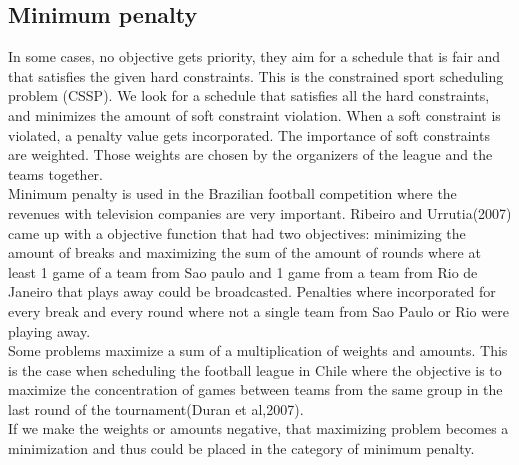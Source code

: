 \subsection{Minimum penalty}
In some cases, no objective gets priority, they aim for a schedule that is fair and that satisfies the given hard constraints. This is the constrained sport scheduling problem (CSSP). We look for a schedule that satisfies all the hard constraints, and minimizes the amount of soft constraint violation. When a soft constraint is violated, a penalty value gets incorporated. The importance of soft constraints are weighted. Those weights are chosen by the organizers of the league and the teams together.
\\[5px] 
Minimum penalty is used in the Brazilian football competition where the revenues with television companies are very important. Ribeiro and Urrutia(2007) came up with a objective function that had two objectives: minimizing the amount of breaks and maximizing the sum of the amount of rounds where at least 1 game of a team from Sao paulo and 1 game from a team from Rio de Janeiro that plays away could be broadcasted. Penalties where incorporated for every break and every round where not a single team from Sao Paulo or Rio were playing away. 
\\[5px]
Some problems maximize a sum of a multiplication of weights and amounts. This is the case when scheduling the football league in Chile where the objective is to maximize the concentration of games between teams from the same group in the last round of the tournament(Duran et al,2007).
\\[5px]
If we make the weights or amounts negative, that maximizing problem becomes a minimization and thus could be placed in the category of minimum penalty.  

